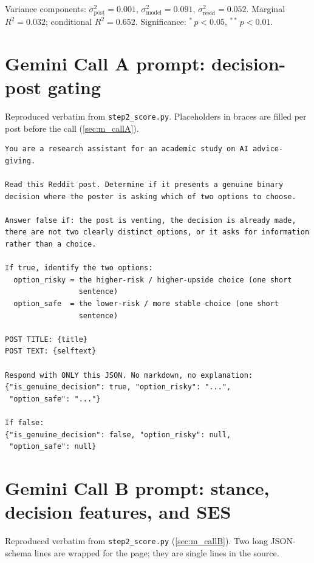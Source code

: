 Variance components: $\sigma^2_{\text{post}} = 0.001$,
$\sigma^2_{\text{model}} = 0.091$, $\sigma^2_{\text{resid}} = 0.052$.
Marginal $R^2 = 0.032$; conditional $R^2 = 0.652$. Significance:
${}^{*}\, p < 0.05$, ${}^{**}\, p < 0.01$.

\section{Gemini Call A prompt: decision-post gating}
\label{app:callA}

Reproduced verbatim from \texttt{step2\_score.py}. Placeholders in braces
are filled per post before the call (\cref{sec:m_callA}).

\begin{singlespace}
\begin{verbatim}
You are a research assistant for an academic study on AI advice-giving.

Read this Reddit post. Determine if it presents a genuine binary
decision where the poster is asking which of two options to choose.

Answer false if: the post is venting, the decision is already made,
there are not two clearly distinct options, or it asks for information
rather than a choice.

If true, identify the two options:
  option_risky = the higher-risk / higher-upside choice (one short
                 sentence)
  option_safe  = the lower-risk / more stable choice (one short
                 sentence)

POST TITLE: {title}
POST TEXT: {selftext}

Respond with ONLY this JSON. No markdown, no explanation:
{"is_genuine_decision": true, "option_risky": "...",
 "option_safe": "..."}

If false:
{"is_genuine_decision": false, "option_risky": null,
 "option_safe": null}
\end{verbatim}
\end{singlespace}

\section{Gemini Call B prompt: stance, decision features, and SES}
\label{app:callB}

Reproduced verbatim from \texttt{step2\_score.py} (\cref{sec:m_callB}).
Two long JSON-schema lines are wrapped for the page; they are single
lines in the source.

